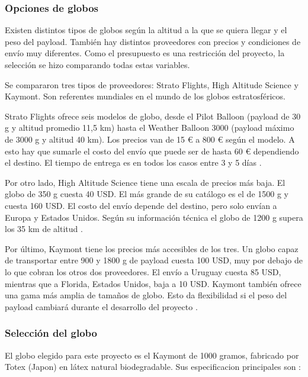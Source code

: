 \documentclass[12pt,a4paper]{article}
\begin{document}
\subsubsection{Opciones de globos}\label{opciones-de-globos}

Existen distintos tipos de globos según la altitud a la que se quiera llegar y el peso del payload. También hay distintos proveedores con precios y condiciones de envío muy diferentes. Como el presupuesto es una restricción del proyecto, la selección se hizo comparando todas estas variables.

Se compararon tres tipos de proveedores: Strato Flights, High Altitude Science y Kaymont. Son referentes mundiales en el mundo de los globos estratosféricos.

Strato Flights ofrece seis modelos de globo, desde el Pilot Balloon (payload de 30 g y altitud promedio 11,5 km) hasta el Weather Balloon 3000 (payload máximo de 3000 g y altitud 40 km). Los precios van de 15 € a 800 € según el modelo. A esto hay que sumarle el costo del envío que puede ser de hasta 60 € dependiendo el destino. El tiempo de entrega es en todos los casos entre 3 y 5 días \cite{ref76}.

Por otro lado, High Altitude Science tiene una escala de precios más baja. El globo de 350 g cuesta 40 USD. El más grande de su catálogo es el de 1500 g y cuesta 160 USD. El costo del envío depende del destino, pero solo envían a Europa y Estados Unidos. Según su información técnica el globo de 1200 g supera los 35 km de altitud \cite{ref75}.

Por último, Kaymont tiene los precios más accesibles de los tres. Un globo capaz de transportar entre 900 y 1800 g de payload cuesta 100 USD, muy por debajo de lo que cobran los otros dos proveedores. El envío a Uruguay cuesta 85 USD, mientras que a Florida, Estados Unidos, baja a 10 USD. Kaymont también ofrece una gama más amplia de tamaños de globo. Esto da flexibilidad si el peso del payload cambiará durante el desarrollo del proyecto \cite{ref76}.

\subsubsection{Selección del globo}\label{selecciuxf3n-del-globo}
El globo elegido para este proyecto es el Kaymont de 1000 gramos, fabricado por Totex (Japon) en látex natural biodegradable. Sus especificacion principales son \cite{ref77}:
\end{document}
